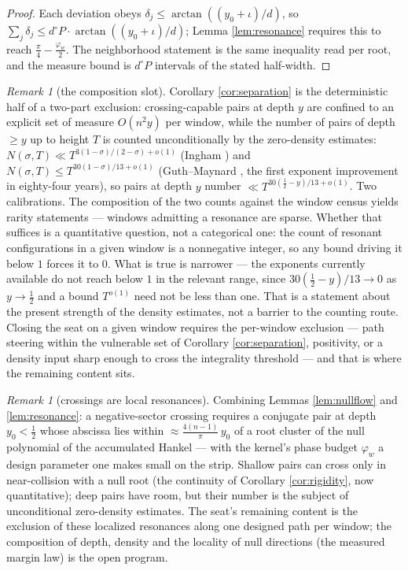 \documentclass[11pt]{article}
\theoremstyle{plain}
\theoremstyle{definition}
\theoremstyle{remark}
\newtheorem{remark}[theorem]{Remark}
\begin{document}
\begin{proof}
Each deviation obeys $\delta_j\le\arctan((y_0+\iota)/d)$, so
$\sum_j\delta_j\le d^{\circ}\!P\cdot\arctan((y_0+\iota)/d)$; Lemma \ref{lem:resonance}
requires this to reach $\tfrac\pi4-\tfrac{\varphi_w}2$. The neighborhood statement is
the same inequality read per root, and the measure bound is $d^{\circ}\!P$ intervals
of the stated half-width.
\end{proof}

\begin{remark}[the composition slot]
Corollary \ref{cor:separation} is the deterministic half of a two-part exclusion:
crossing-capable pairs at depth $y$ are confined to an explicit set of measure
$O(n^2y)$ per window, while the number of pairs of depth $\ge y$ up to height $T$ is
counted unconditionally by the zero-density estimates: $N(\sigma,T)\ll
T^{3(1-\sigma)/(2-\sigma)+o(1)}$ (Ingham \cite{Ingham1940}) and
$N(\sigma,T)\le T^{30(1-\sigma)/13+o(1)}$ (Guth--Maynard \cite{GuthMaynard2024}, the
first exponent improvement in eighty-four years), so pairs at depth $y$ number
$\ll T^{30(\frac12-y)/13+o(1)}$. Two calibrations. The composition of the two counts
against the window census yields rarity statements --- windows admitting a resonance
are sparse. Whether that suffices is a quantitative question, not a categorical one:
the count of resonant configurations in a given window is a nonnegative integer, so
any bound driving it below $1$ forces it to $0$. What is true is narrower --- the
exponents currently available do not reach below $1$ in the relevant range, since
$30(\frac12-y)/13\to0$ as $y\to\frac12$ and a bound $T^{o(1)}$ need not be less than
one. That is a statement about the present strength of the density estimates, not a
barrier to the counting route. Closing the seat on a given window requires the
per-window exclusion --- path steering within the vulnerable set of Corollary
\ref{cor:separation}, positivity, or a density input sharp enough to cross the
integrality threshold --- and that is where the remaining content sits.
\end{remark}

\begin{remark}[crossings are local resonances]\label{rem:crossings}
Combining Lemmas \ref{lem:nullflow} and \ref{lem:resonance}: a negative-sector
crossing requires a conjugate pair at depth $y_0<\tfrac12$ whose abscissa lies within
$\approx\frac{4(n-1)}{\pi}\,y_0$ of a root cluster of the null polynomial of the
accumulated Hankel --- with the kernel's phase budget $\varphi_w$ a design parameter
one makes small on the strip. Shallow pairs can cross only in near-collision with a
null root (the continuity of Corollary \ref{cor:rigidity}, now quantitative); deep
pairs have room, but their number is the subject of unconditional zero-density
estimates. The seat's remaining content is the exclusion of these localized
resonances along one designed path per window; the composition of depth, density and
the locality of null directions (the measured margin law) is the open program.
\end{remark}
\end{document}
